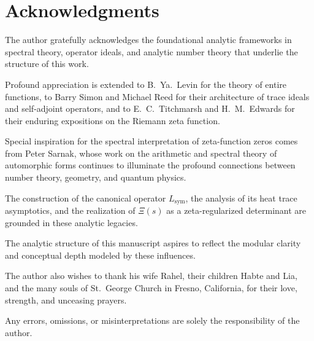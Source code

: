 \section*{Acknowledgments}

The author gratefully acknowledges the foundational analytic frameworks in spectral theory, operator ideals, and analytic number theory that underlie the structure of this work.

Profound appreciation is extended to B.~Ya.~Levin for the theory of entire functions, to Barry Simon and Michael Reed for their architecture of trace ideals and self-adjoint operators, and to E.~C.~Titchmarsh and H.~M.~Edwards for their enduring expositions on the Riemann zeta function.

Special inspiration for the spectral interpretation of zeta-function zeros comes from Peter Sarnak, whose work on the arithmetic and spectral theory of automorphic forms continues to illuminate the profound connections between number theory, geometry, and quantum physics.

The construction of the canonical operator \( L_{\mathrm{sym}} \), the analysis of its heat trace asymptotics, and the realization of \( \Xi(s) \) as a zeta-regularized determinant are grounded in these analytic legacies.

\medskip

\noindent
The analytic structure of this manuscript aspires to reflect the modular clarity and conceptual depth modeled by these influences.

\medskip

\noindent
The author also wishes to thank his wife Rahel, their children Habte and Lia, and the many souls of St.~George Church in Fresno, California, for their love, strength, and unceasing prayers.

\medskip

\noindent
Any errors, omissions, or misinterpretations are solely the responsibility of the author.
